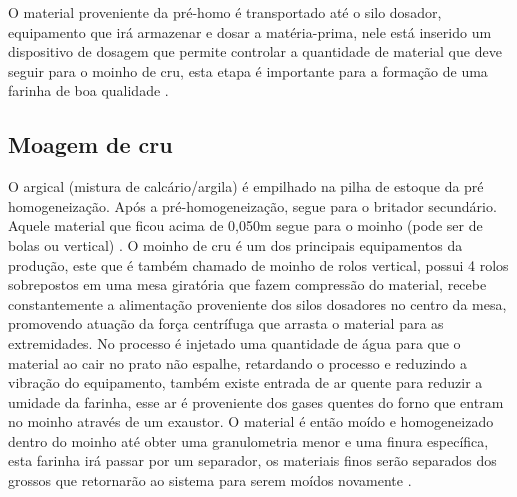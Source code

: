  \pagebreak

O material proveniente da pré-homo é transportado até o silo dosador, equipamento
que irá armazenar e dosar a matéria-prima, nele está inserido um dispositivo de dosagem que
permite controlar a quantidade de material que deve seguir para o moinho de cru, esta etapa é
importante para a formação de uma farinha de boa qualidade \cite{Carvalho2023}.

 	\begin{figure}[h!] 
   	    \captionsetup{width=16cm}%
	\end{figure}

\pagebreak

 \subsection{Moagem de cru}

O argical (mistura de calcário/argila) é empilhado na pilha de estoque da pré homogeneização. Após a pré-homogeneização, segue para o britador secundário. Aquele material que ficou acima de 0,050m segue para o moinho (pode ser de bolas ou vertical) \cite{Andre2011}. O moinho de
cru é um dos principais equipamentos da produção, este que é também chamado de moinho de
rolos vertical, possui 4 rolos sobrepostos em uma mesa giratória que fazem compressão do
material, recebe constantemente a alimentação proveniente dos silos dosadores no centro da
mesa, promovendo atuação da força centrífuga que arrasta o material para as extremidades.
No processo é injetado uma quantidade de água para que o material ao cair no prato não
espalhe, retardando o processo e reduzindo a vibração do equipamento, também existe entrada
de ar quente para reduzir a umidade da farinha, esse ar é proveniente dos gases quentes do
forno que entram no moinho através de um exaustor. O material é então moído e
homogeneizado dentro do moinho até obter uma granulometria menor e uma finura
específica, esta farinha irá passar por um separador, os materiais finos serão separados dos
grossos que retornarão ao sistema para serem moídos novamente \cite{Carvalho2023}.

